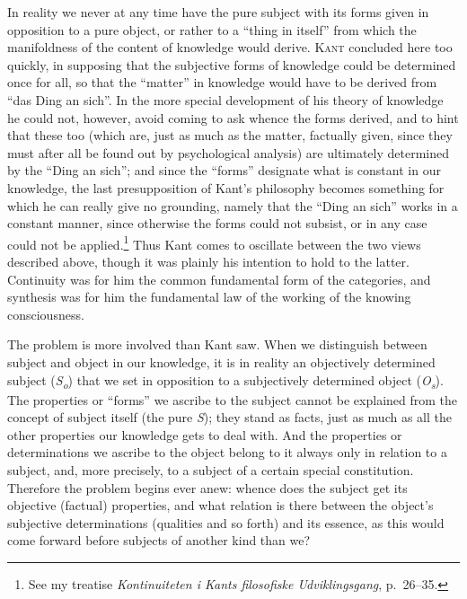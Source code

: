 \documentclass[12pt,a4paper]{book}
\newcommand{\opage}[1]{\marginnote{\footnotesize\textit{[#1]}}}
\begin{document}
In reality we never at any time have the pure subject \opage{50}with its forms given in
opposition to a pure object, or rather to a ``thing in itself'' from which the
manifoldness of the content of knowledge would derive. \textsc{Kant} concluded
here too quickly, in supposing that the subjective forms of knowledge could be
determined once for all, so that the ``matter'' in knowledge would have to be
derived from ``das Ding an sich''. In the more special development of his theory
of knowledge he could not, however, avoid coming to ask whence the forms
derived, and to hint that these too (which are, just as much as the matter,
factually given, since they must after all be found out by psychological
analysis) are ultimately determined by the ``Ding an sich''; and since the
``forms'' designate what is constant in our knowledge, the last presupposition of
Kant's philosophy becomes something for which he can really give no grounding,
namely that the ``Ding an sich'' works in a constant manner, since otherwise the
forms could not subsist, or in any case could not be applied.\footnote{See my
treatise \textit{Kontinuiteten i Kants filosofiske Udviklingsgang}, p.~26--35.}
Thus Kant comes to oscillate between the two views described above, though it was
plainly his intention to hold to the latter. Continuity was for him the common
fundamental form of the categories, and synthesis was for him the fundamental law
of the working of the knowing consciousness.

The problem is more involved than Kant saw. When we distinguish between subject
and object in our knowledge, it is in reality an objectively determined subject
(\textit{S}\textsubscript{\textit{o}}) that we set in opposition to a
subjectively determined object (\textit{O}\textsubscript{\textit{s}}). The
properties or ``forms'' we ascribe to the subject cannot be explained from the
concept of subject itself (the pure \textit{S}); they stand as facts, just as
much as all the other properties our knowledge gets to deal with. And the
properties or determinations we ascribe to the object belong to it always only in
relation to a subject, and, more precisely, to a subject of a certain special
constitution. Therefore the problem begins ever anew: whence does the subject get
its objective (factual) properties, and what relation is there between the
object's subjective determinations (qualities and so forth) and its essence, as
this would come forward before subjects of another kind than we?
\end{document}
